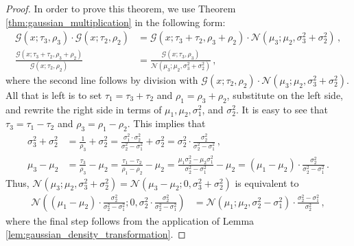 \documentclass[a4paper]{article}
\newcommand{\Normal}[3]{{\mathcal N} \left({#1};{#2},{#3}\right)}
\newcommand{\Gauss}[3]{{\mathcal G} \left({#1};{#2},{#3}\right)}
\theoremstyle{definition}
\begin{document}
\begin{proof}\label{prf:gaussian_division_theorem}
    In order to prove this theorem, we use Theorem \ref{thm:gaussian_multiplication} in the following form:
    \begin{align*}
        \Gauss{x}{\tau_3}{\rho_3} \cdot \Gauss{x}{\tau_2}{\rho_2} 
        & = \Gauss{x}{\tau_3 + \tau_2}{\rho_3 + \rho_2} \cdot \Normal{\mu_3}{\mu_2}{\sigma_3^2 + \sigma_2^2}\,, \\
        \frac{\Gauss{x}{\tau_3 + \tau_2}{\rho_3 + \rho_2}}{\Gauss{x}{\tau_2}{\rho_2}} 
        & = \frac{\Gauss{x}{\tau_3}{\rho_3}}{\Normal{\mu_3}{\mu_2}{\sigma_3^2 + \sigma_2^2}} \,,
    \end{align*}
    where the second line follows by division with $\Gauss{x}{\tau_2}{\rho_2} \cdot \Normal{\mu_3}{\mu_2}{\sigma_3^2 + \sigma_2^2}$. All that is left is to set $\tau_1 = \tau_3 + \tau_2$ and $\rho_1 = \rho_3 + \rho_2$, substitute on the left side, and rewrite the right side in terms of $\mu_1, \mu_2, \sigma_1^2$, and $\sigma_2^2$. It is easy to see that $\tau_3 = \tau_1 - \tau_2$ and $\rho_3 = \rho_1 - \rho_2$. This implies that 
    \begin{align*}
        \sigma_3^2 + \sigma_2^2 
        & = \frac{1}{\rho_3} + \sigma_2^2 = \frac{\sigma_1^2\cdot\sigma_2^2}{\sigma_2^2-\sigma_1^2} + \sigma_2^2 = \sigma_2^2 \cdot \frac{\sigma_2^2}{\sigma_2^2-\sigma_1^2} \,, \\
        \mu_3 - \mu_2 
        & = \frac{\tau_3}{\rho_3} - \mu_2 = \frac{\tau_1 - \tau_2}{\rho_1 - \rho_2} - \mu_2 
        = \frac{\mu_1\sigma_2^2-\mu_2\sigma_1^2}{\sigma_2^2 - \sigma_1^2} - \mu_2 = \left( \mu_1 - \mu_2 \right) \cdot \frac{\sigma_2^2}{\sigma_2^2 - \sigma_1^2}\,.
    \end{align*}
    Thus, $\Normal{\mu_3}{\mu_2}{\sigma_3^2 + \sigma_2^2} = \Normal{\mu_3 - \mu_2}{0}{\sigma_3^2 + \sigma_2^2}$ is equivalent to 
    \begin{align*}
        \Normal{\left( \mu_1 - \mu_2 \right) \cdot \frac{\sigma_2^2}{\sigma_2^2 - \sigma_1^2}}{0}{\sigma_2^2 \cdot \frac{\sigma_2^2}{\sigma_2^2-\sigma_1^2}} 
        & = \Normal{\mu_1}{\mu_2}{\sigma_2^2 - \sigma_1^2} \cdot \frac{\sigma_2^2 - \sigma_1^2}{\sigma_2^2} \,,
    \end{align*}
    where the final step follows from the application of Lemma \ref{lem:gaussian_density_transformation}.
\end{proof}
\end{document}
